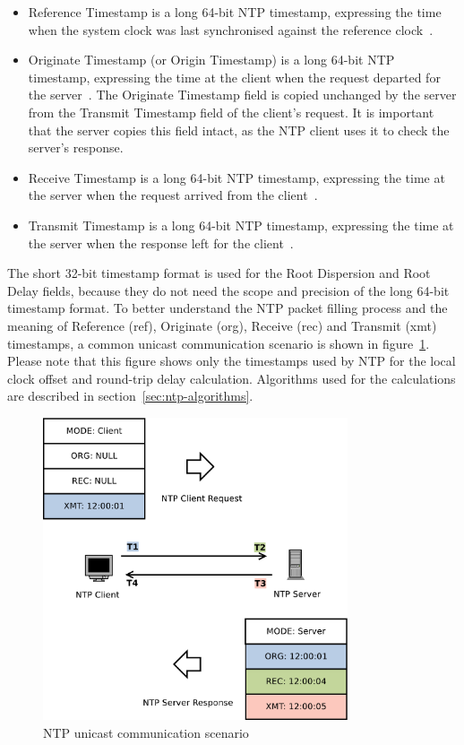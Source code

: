 \begin{itemize}
Kiss codes are particularly used by the server to tell the client to stop sending packets or
to increase its polling interval.
For stratum 1, this is a four-octet, left-justified, zero-padded ASCII
string assigned to the reference clock (e.g. "GPS" when synchronising against the Global Position System clock).
Above stratum 1, this is the reference identifier of the server used for synchronisation
and can be used by the client together with the stratum field to detect loops in the NTP hierarchy.
If communicating over IPv4, the identifier is IPv4 address.
If communicating over IPv6, it is the first four octets of the MD5 hash of the IPv6 address~\cite{rfc5905}.
\item
Reference Timestamp is a long 64-bit NTP timestamp, expressing the time
when the system clock was last synchronised against the reference clock~\cite{rfc5905}.
\item
Originate Timestamp (or Origin Timestamp) is a long 64-bit NTP timestamp, expressing the time
at the client when the request departed for the server~\cite{rfc5905}.
The Originate Timestamp field is copied
unchanged by the server from the Transmit Timestamp field of the client's request.
It is important that the server copies this field intact,
as the NTP client uses it to check the server's response.
\item
Receive Timestamp is a long 64-bit NTP timestamp, expressing the time
at the server when the request arrived from the client~\cite{rfc5905}.
\item
Transmit Timestamp is a long 64-bit NTP timestamp, expressing the time
at the server when the response left for the client~\cite{rfc5905}.
\end{itemize}

The short 32-bit timestamp format is used for the Root Dispersion and Root Delay fields,
because they do not need the scope and precision of the long 64-bit timestamp format.
To better understand the NTP packet filling process and the meaning of
Reference (ref), Originate (org), Receive (rec) and Transmit (xmt) timestamps,
a common unicast communication scenario is shown in figure~\ref{fig:ntp-client-server}.
Please note that this figure shows only the
timestamps used by NTP for the local clock offset and round-trip delay calculation.
Algorithms used for the calculations are described in section~\ref{sec:ntp-algorithms}.

\begin{figure}
	\centering
	\includegraphics[width=9cm,keepaspectratio]{fig/ntp-client-server.pdf}
	\caption{NTP unicast communication scenario}
	\label{fig:ntp-client-server}
\end{figure}
